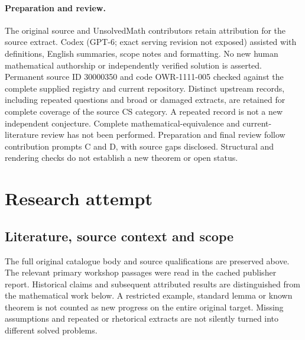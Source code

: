 \documentclass[11pt]{article}
\begin{document}
\paragraph{Preparation and review.}
The original source and UnsolvedMath contributors retain attribution for the source extract. Codex (GPT-6; exact serving revision not exposed) assisted with definitions, English summaries, scope notes and formatting. No new human mathematical authorship or independently verified solution is asserted. Permanent source ID 30000350 and code OWR-1111-005 checked against the complete supplied registry and current repository. Distinct upstream records, including repeated questions and broad or damaged extracts, are retained for complete coverage of the source CS category. A repeated record is not a new independent conjecture. Complete mathematical-equivalence and current-literature review has not been performed. Preparation and final review follow contribution prompts C and D, with source gaps disclosed. Structural and rendering checks do not establish a new theorem or open status.
\label{end:30000350}

\section{Research attempt}
\subsection{Literature, source context and scope}
The full original catalogue body and source qualifications are preserved above. The relevant primary workshop passages were read in the cached publisher report. Historical claims and subsequent attributed results are distinguished from the mathematical work below. A restricted example, standard lemma or known theorem is not counted as new progress on the entire original target. Missing assumptions and repeated or rhetorical extracts are not silently turned into different solved problems.
\end{document}
